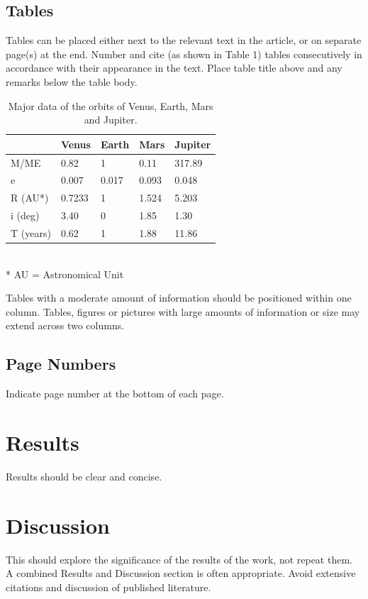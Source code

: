 \documentclass[]{IAC_style}
\begin{document}
\subsection{Tables}
Tables can be placed either next to the relevant text in the article, or on separate page(s) at the end. Number and cite (as shown in Table 1) tables consecutively in accordance with their appearance in the text. Place table title above and any remarks below the table body.

\newcolumntype{b}{X}
\begin{table}
\centering
\label{tab:table}
\caption{Major data of the orbits of Venus, Earth, Mars and Jupiter.}
\begin{tabularx}{\columnwidth}{bssss}
\hline
& Venus & Earth & Mars & Jupiter\\\hline
M/ME & 0.82 & 1 & 0.11 & 317.89\\
e & 0.007 & 0.017 & 0.093 & 0.048\\
R (AU*) & 0.7233 & 1 & 1.524 & 5.203\\
i (deg) & 3.40 & 0 & 1.85 & 1.30\\
T (years) & 0.62 & 1 & 1.88 & 11.86\\
\hline
\end{tabularx}
\\\footnotesize{* AU = Astronomical Unit}
\end{table}


Tables with a moderate amount of information should be positioned within one column. Tables, figures or pictures with large amounts of information or size may extend across two columns.


\subsection{Page Numbers}
Indicate page number at the bottom of each page.

\section{Results}
Results should be clear and concise.


\section{Discussion}
This should explore the significance of the results of the work, not repeat them. A combined Results and Discussion section is often appropriate. Avoid extensive citations and discussion of published literature.
\end{document}
